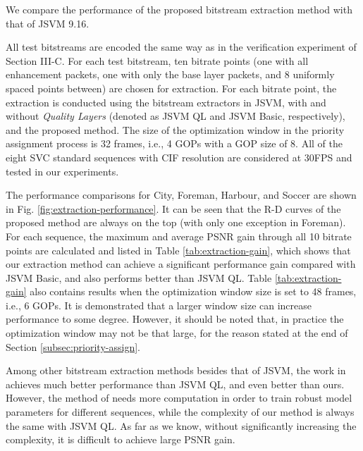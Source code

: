 \documentclass[journal]{IEEEtran}
\begin{document}
We compare the performance of the proposed bitstream extraction method with that of JSVM 9.16.

All test bitstreams are encoded the same way as in the verification experiment of Section III-C. For each test bitstream, ten bitrate points (one with all enhancement packets, one with only the base layer packets, and 8 uniformly spaced points between) are chosen for extraction. For each bitrate point, the extraction is conducted using the bitstream extractors in JSVM, with and without \textit{Quality Layers} (denoted as JSVM QL and JSVM Basic, respectively), and the proposed method. The size of the optimization window in the priority assignment process is 32 frames, i.e., 4 GOPs with a GOP size of 8. All of the eight SVC standard sequences with CIF resolution are considered at 30FPS and tested in our experiments.

The performance comparisons for City, Foreman, Harbour, and Soccer are shown in Fig. \ref{fig:extraction-performance}. It can be seen that the R-D curves of the proposed method are always on the top (with only one exception in Foreman). For each sequence, the maximum and average PSNR gain through all 10 bitrate points are calculated and listed in Table \ref{tab:extraction-gain}, which shows that our extraction method can achieve a significant performance gain compared with JSVM Basic, and also performs better than JSVM QL. Table \ref{tab:extraction-gain} also contains results when the optimization window size is set to 48 frames, i.e., 6 GOPs. It is demonstrated that a larger window size can increase performance to some degree. However, it should be noted that, in practice the optimization window may not be that large, for the reason stated at the end of Section \ref{subsec:priority-assign}.

Among other bitstream extraction methods besides that of JSVM, the work in \cite{Maani09} achieves much better performance than JSVM QL, and even better than ours. However, the method of \cite{Maani09} needs more computation in order to train robust model parameters for different sequences, while the complexity of our method is always the same with JSVM QL. As far as we know, without significantly increasing the complexity, it is difficult to achieve large PSNR gain.
\end{document}
